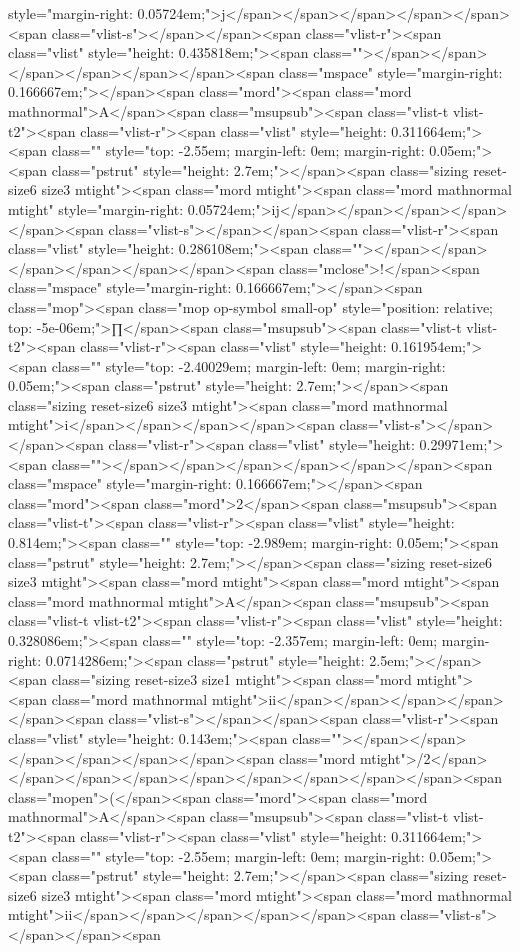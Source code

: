 style="margin-right: 0.05724em;">j</span></span></span></span></span><span class="vlist-s">​</span></span><span class="vlist-r"><span class="vlist" style="height: 0.435818em;"><span class=""></span></span></span></span></span></span><span class="mspace" style="margin-right: 0.166667em;"></span><span class="mord"><span class="mord mathnormal">A</span><span class="msupsub"><span class="vlist-t vlist-t2"><span class="vlist-r"><span class="vlist" style="height: 0.311664em;"><span class="" style="top: -2.55em; margin-left: 0em; margin-right: 0.05em;"><span class="pstrut" style="height: 2.7em;"></span><span class="sizing reset-size6 size3 mtight"><span class="mord mtight"><span class="mord mathnormal mtight" style="margin-right: 0.05724em;">ij</span></span></span></span></span><span class="vlist-s">​</span></span><span class="vlist-r"><span class="vlist" style="height: 0.286108em;"><span class=""></span></span></span></span></span></span><span class="mclose">!</span><span class="mspace" style="margin-right: 0.166667em;"></span><span class="mop"><span class="mop op-symbol small-op" style="position: relative; top: -5e-06em;">∏</span><span class="msupsub"><span class="vlist-t vlist-t2"><span class="vlist-r"><span class="vlist" style="height: 0.161954em;"><span class="" style="top: -2.40029em; margin-left: 0em; margin-right: 0.05em;"><span class="pstrut" style="height: 2.7em;"></span><span class="sizing reset-size6 size3 mtight"><span class="mord mathnormal mtight">i</span></span></span></span><span class="vlist-s">​</span></span><span class="vlist-r"><span class="vlist" style="height: 0.29971em;"><span class=""></span></span></span></span></span></span><span class="mspace" style="margin-right: 0.166667em;"></span><span class="mord"><span class="mord">2</span><span class="msupsub"><span class="vlist-t"><span class="vlist-r"><span class="vlist" style="height: 0.814em;"><span class="" style="top: -2.989em; margin-right: 0.05em;"><span class="pstrut" style="height: 2.7em;"></span><span class="sizing reset-size6 size3 mtight"><span class="mord mtight"><span class="mord mtight"><span class="mord mathnormal mtight">A</span><span class="msupsub"><span class="vlist-t vlist-t2"><span class="vlist-r"><span class="vlist" style="height: 0.328086em;"><span class="" style="top: -2.357em; margin-left: 0em; margin-right: 0.0714286em;"><span class="pstrut" style="height: 2.5em;"></span><span class="sizing reset-size3 size1 mtight"><span class="mord mtight"><span class="mord mathnormal mtight">ii</span></span></span></span></span><span class="vlist-s">​</span></span><span class="vlist-r"><span class="vlist" style="height: 0.143em;"><span class=""></span></span></span></span></span></span><span class="mord mtight">/2</span></span></span></span></span></span></span></span></span><span class="mopen">(</span><span class="mord"><span class="mord mathnormal">A</span><span class="msupsub"><span class="vlist-t vlist-t2"><span class="vlist-r"><span class="vlist" style="height: 0.311664em;"><span class="" style="top: -2.55em; margin-left: 0em; margin-right: 0.05em;"><span class="pstrut" style="height: 2.7em;"></span><span class="sizing reset-size6 size3 mtight"><span class="mord mtight"><span class="mord mathnormal mtight">ii</span></span></span></span></span><span class="vlist-s">​</span></span><span 